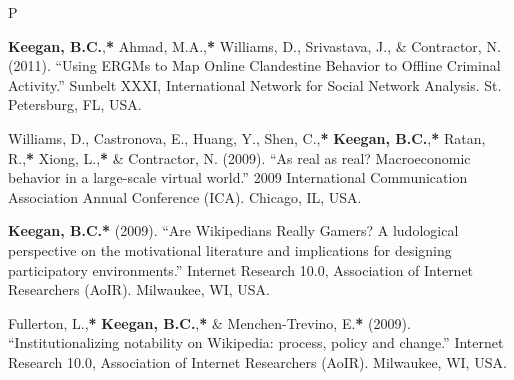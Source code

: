 \documentclass{cv}
\begin{document}
\begin{entries}{P}
		\item \textbf{Keegan, B.C.},\textbf{*} Ahmad, M.A.,\textbf{*} Williams, D., Srivastava, J., \& Contractor, N. (2011). ``Using ERGMs to Map Online Clandestine Behavior to Offline Criminal Activity.'' Sunbelt XXXI, International Network for Social Network Analysis. St. Petersburg, FL, USA.
		\item Williams, D., Castronova, E., Huang, Y., Shen, C.,\textbf{*} \textbf{Keegan, B.C.},\textbf{*} Ratan, R.,\textbf{*} Xiong, L.,\textbf{*} \& Contractor, N. (2009). ``As real as real? Macroeconomic behavior in a large-scale virtual world.'' 2009 International Communication Association Annual Conference (ICA). Chicago, IL, USA.
		\item \textbf{Keegan, B.C.}\textbf{*} (2009). ``Are Wikipedians Really Gamers? A ludological perspective on the motivational literature and implications for designing participatory environments.'' Internet Research 10.0, Association of Internet Researchers (AoIR). Milwaukee, WI, USA.
		\item Fullerton, L.,\textbf{*} \textbf{Keegan, B.C.},\textbf{*} \& Menchen-Trevino, E.\textbf{*} (2009). ``Institutionalizing notability on Wikipedia: process, policy and change.'' Internet Research 10.0, Association of Internet Researchers (AoIR). Milwaukee, WI, USA.
	\end{entries}
\end{document}
